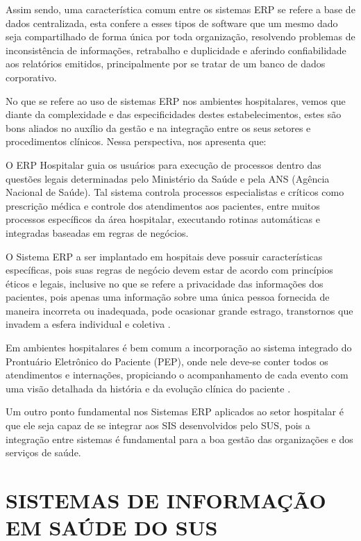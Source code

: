 Assim sendo, uma característica comum entre os sistemas ERP se refere a base de dados centralizada, esta confere a esses tipos de software que um mesmo dado seja compartilhado de forma única por toda organização, resolvendo problemas de inconsistência de informações, retrabalho e duplicidade e aferindo confiabilidade aos relatórios emitidos, principalmente por se tratar de um banco de dados corporativo. 

No que se refere ao uso de sistemas ERP nos ambientes hospitalares, vemos que diante da complexidade e das especificidades destes estabelecimentos, estes são bons aliados no auxílio da gestão e na integração entre os seus setores e procedimentos clínicos. Nessa perspectiva,  nos apresenta que:

\begin{citacao}
O ERP Hospitalar guia os usuários para execução de processos dentro das questões legais determinadas pelo Ministério da Saúde e pela ANS (Agência Nacional de Saúde). Tal sistema controla processos especialistas e críticos como prescrição médica e controle dos atendimentos aos pacientes, entre muitos processos específicos da área hospitalar, executando rotinas automáticas e integradas baseadas em regras de negócios.
\end{citacao}

O Sistema ERP a ser implantado em hospitais deve possuir características específicas, pois suas regras de negócio devem estar de acordo com princípios éticos e legais, inclusive no que se refere a privacidade das informações dos pacientes, pois apenas uma informação sobre uma única pessoa fornecida de maneira incorreta ou inadequada, pode ocasionar grande estrago, transtornos que invadem a esfera individual e coletiva \cite{conass}.

Em ambientes hospitalares é bem comum a incorporação ao sistema integrado do Prontuário Eletrônico do Paciente (PEP), onde nele deve-se conter todos os atendimentos e internações, propiciando o acompanhamento de cada evento com uma visão detalhada da história e da evolução clínica do paciente \cite{baptista}.

Um outro ponto fundamental nos Sistemas ERP aplicados ao setor hospitalar é que ele seja capaz de se integrar aos SIS desenvolvidos pelo SUS, pois a integração entre sistemas é fundamental para a boa gestão das organizações e dos serviços de saúde. 

\section{SISTEMAS DE INFORMAÇÃO EM SAÚDE DO SUS}

